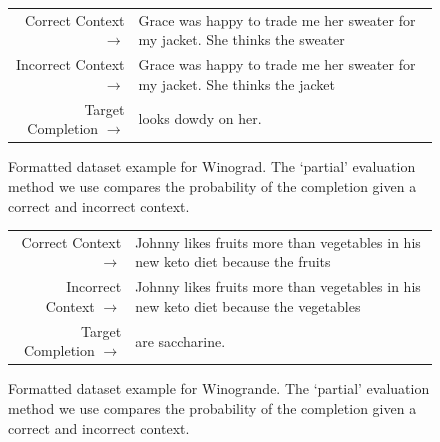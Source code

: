 \documentclass{article}
\begin{document}
\begin{figure} { \tt \footnotesize \begin{tabularx}{\linewidth}{r X} \toprule
Correct Context $\to$ & Grace was happy to trade me her sweater for my jacket. She thinks the sweater\\
Incorrect Context $\to$ & Grace was happy to trade me her sweater for my jacket. She thinks the jacket\\
 \midrule
Target Completion $\to$ & looks dowdy on her. \\
 \bottomrule \end{tabularx} }
\caption{Formatted dataset example for Winograd.  The `partial' evaluation method we use compares the probability of the completion given a correct and incorrect context.}  \label{eval:Winograd}  \end{figure}
\begin{figure} { \tt \footnotesize \begin{tabularx}{\linewidth}{r X}
\toprule
Correct Context $\to$ & Johnny likes fruits more than vegetables in his new keto diet because the fruits \\
Incorrect Context $\to$ & Johnny likes fruits more than vegetables in his new keto diet because the vegetables \\
\midrule
Target Completion $\to$ & are saccharine. \\
\bottomrule \end{tabularx} }  \caption{Formatted dataset example for Winogrande. The `partial' evaluation method we use compares the probability of the completion given a correct and incorrect context.}  \label{eval:Winogrande}  \end{figure}
\end{document}
